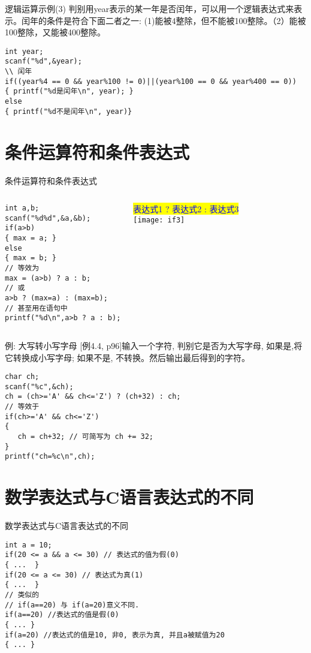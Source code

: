 \begin{frame}{逻辑运算示例(3)}
判别用year表示的某一年是否闰年，可以用一个逻辑表达式来表示。闰年的条件是符合下面二者之一: (1)能被4整除，但不能被100整除。（2）能被100整除，又能被400整除。
\begin{lstlisting}
int year;
scanf("%d",&year);
\\ 闰年
if((year%4 == 0 && year%100 != 0)||(year%100 == 0 && year%400 == 0))
{ printf("%d是闰年\n", year); }
else
{ printf("%d不是闰年\n", year)}
\end{lstlisting}
\end{frame}

\section{条件运算符和条件表达式}

\begin{frame}{条件运算符和条件表达式}
\begin{columns}[T]
\begin{lstlisting}
int a,b;
scanf("%d%d",&a,&b);
if(a>b)
{ max = a; }
else
{ max = b; }
// 等效为
max = (a>b) ? a : b;
// 或
a>b ? (max=a) : (max=b);
// 甚至用在语句中
printf("%d\n",a>b ? a : b);
\end{lstlisting}
\colorbox{yellow}{\textcolor{blue}{表达式1 ? 表达式2 : 表达式3}}\\
\texttt{[image: if3]}
\end{columns}
\end{frame}

\begin{frame}{例: 大写转小写字母}
[例4.4, p96]输入一个字符, 判别它是否为大写字母, 如果是,将它转换成小写字母; 如果不是, 不转换。然后输出最后得到的字符。
\begin{lstlisting}
char ch;
scanf("%c",&ch);
ch = (ch>='A' && ch<='Z') ? (ch+32) : ch;
// 等效于
if(ch>='A' && ch<='Z')
{
   ch = ch+32; // 可简写为 ch += 32;
}
printf("ch=%c\n",ch);
\end{lstlisting}
\end{frame}

\section{数学表达式与C语言表达式的不同}

\begin{frame}{数学表达式与C语言表达式的不同}
\begin{lstlisting}
int a = 10;
if(20 <= a && a <= 30) // 表达式的值为假(0)
{ ...  }
if(20 <= a <= 30) // 表达式为真(1)
{ ...  }
// 类似的
// if(a==20) 与 if(a=20)意义不同.
if(a==20) //表达式的值是假(0)
{ ... }
if(a=20) //表达式的值是10, 非0, 表示为真, 并且a被赋值为20
{ ... }
\end{lstlisting}
\end{frame}

